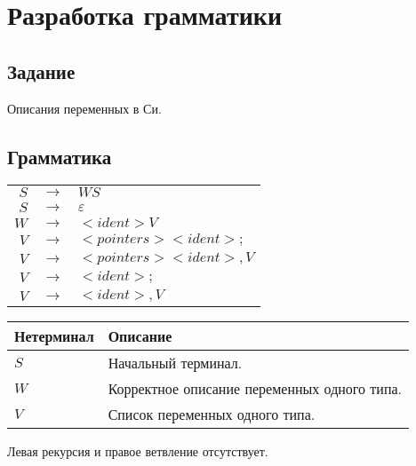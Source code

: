 \section{Разработка грамматики}

\subsection{Задание}
Описания переменных в Си.

\subsection{Грамматика}
\begin{center}
    \begin{tabular}{ r c l }
        $S$ & $\to$ & $WS$\\
        $S$ & $\to$ & $\varepsilon$ \\
        $W$ & $\to$ & $<ident>V$\\
        $V$ & $\to$ & $<pointers><ident>;$\\
        $V$ & $\to$ & $<pointers><ident>,V$\\
        $V$ & $\to$ & $<ident>;$\\
        $V$ & $\to$ & $<ident>,V$\\
    \end{tabular}
    
    \begin{tabular}{ | l | l | }
        \hline
        \textbf{Нетерминал} & \textbf{Описание}\\
        \hline
        $S$ & Начальный терминал. \\
        \hline
        $W$ & Корректное описание переменных одного типа. \\
        \hline
        $V$ & Список переменных одного типа. \\
        \hline
    \end{tabular}
\end{center}

Левая рекурсия и правое ветвление отсутствует.

